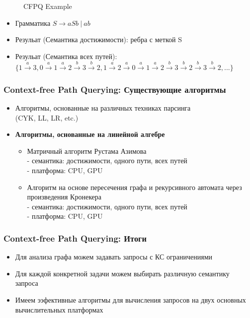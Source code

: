 \documentclass[xcolor=table,english]{beamer}
\begin{document}
\begin{frame}[fragile]
\begin{minipage}[m]{\linewidth}
\begin{figure}
            \caption{CFPQ Example}
        \end{figure}
    \end{minipage}\hfill
    \begin{minipage}[m]{\linewidth}
        \begin{itemize}
            \item Грамматика $S \rightarrow aSb~|~ab$
            \item Резульат (Семантика достижимости): ребра с меткой S
            \item Резульат (Семантика всех путей): $\{1 \xrightarrow{a} 3, 0 \xrightarrow{a} 1 \xrightarrow{a} 2 \xrightarrow{b} 3 \xrightarrow{b} 2, 1 \xrightarrow{a} 2 \xrightarrow{a} 0 \xrightarrow{a} 1 \xrightarrow{a} 2 \xrightarrow{b} 3 \xrightarrow{b} 2 \xrightarrow{b} 3 \xrightarrow{b} 2, ...\}$
        \end{itemize}
    \end{minipage}
\end{frame}

\begin{frame}[fragile] \frametitle{Context-free Path Querying: Существующие алгоритмы}
    \begin{itemize}
        \item Алгоритмы, основанные на различных техниках парсинга\\(CYK, LL, LR, etc.)
        \item \textbf{Алгоритмы, основанные на линейной алгебре}
        {
            \begin{itemize}
                \item Матричный алгоритм Рустама Азимова
                \\- семантика: достижимости, одного пути, всех путей
                \\- платформа: CPU, GPU
                \item Алгоритм на основе пересечения графа и рекурсивного автомата через произведения Кронекера
                \\- семантика: достижимости, одного пути, всех путей
                \\- платформа: CPU, GPU
            \end{itemize}
        }
    \end{itemize}
\end{frame}

\begin{frame}[fragile] \frametitle{Context-free Path Querying: Итоги}
    \begin{itemize}
        \item Для анализа графа можем задавать запросы с КС ограничениями
        \item Для каждой конкретной задачи можем выбирать различную семантику запроса
        \item Имеем ээфективные алгоритмы для вычисления запросов на двух основных вычислительных платформах
    \end{itemize}
\end{frame}
\end{document}
